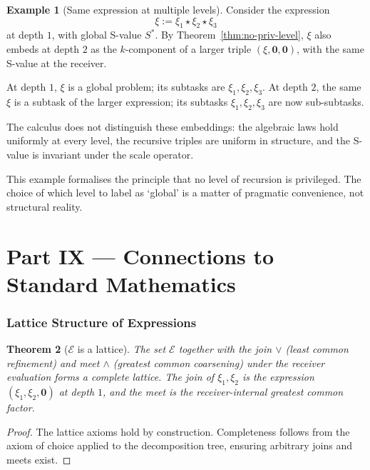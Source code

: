 \documentclass[11pt,a4paper]{article}
\theoremstyle{thmstyle}
\newtheorem{theorem}{Theorem}[section]
\theoremstyle{thmstyle}
\theoremstyle{definition}
\newtheorem{example}[theorem]{Example}
\theoremstyle{remark}
\newcommand{\Expr}{\mathcal{E}}
\newcommand{\Sscalar}{S}
\begin{document}
\begin{example}[Same expression at multiple levels]
\label{ex:hierarchical}
Consider the expression
\[
\xi := \xi_{1} \star \xi_{2} \star \xi_{3}
\]
at depth $1$, with global S-value $\Sscalar^{*}$.
By Theorem~\ref{thm:no-priv-level}, $\xi$ also
embeds at depth $2$ as the $k$-component of a
larger triple $(\xi, \mathbf{0}, \mathbf{0})$, with
the same S-value at the receiver.

At depth $1$, $\xi$ is a global problem; its
subtasks are $\xi_{1}, \xi_{2}, \xi_{3}$.  At
depth $2$, the same $\xi$ is a subtask of the
larger expression; its subtasks $\xi_{1}, \xi_{2},
\xi_{3}$ are now sub-subtasks.

The calculus does not distinguish these embeddings:
the algebraic laws hold uniformly at every level,
the recursive triples are uniform in structure,
and the S-value is invariant under the scale
operator.

This example formalises the principle that no level
of recursion is privileged.  The choice of which
level to label as `global' is a matter of pragmatic
convenience, not structural reality.
\end{example}

\clearpage

\part*{Part IX --- Connections to Standard Mathematics}

\section{Lattice Structure of Expressions}
\label{sec:lattice}

\begin{theorem}[$\Expr$ is a lattice]
\label{thm:expr-lattice}
The set $\Expr$ together with the join $\vee$
(least common refinement) and meet $\wedge$
(greatest common coarsening) under the receiver
evaluation forms a complete lattice.  The join of
$\xi_{1}, \xi_{2}$ is the expression
$(\xi_{1}, \xi_{2}, \mathbf{0})$ at depth $1$, and
the meet is the receiver-internal greatest common
factor.
\end{theorem}

\begin{proof}
The lattice axioms hold by construction.
Completeness follows from the axiom of choice
applied to the decomposition tree, ensuring
arbitrary joins and meets exist.
\end{proof}
\end{document}
